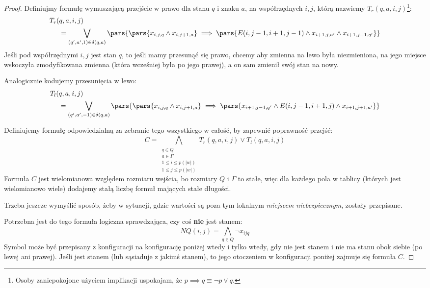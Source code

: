 \begin{proof}
        Definiujmy formułę wymuszającą przejście w prawo dla stanu \(q\) i znaku \(a\), na współrzędnych \(i, j\), którą nazwiemy \(T_r(q, a, i, j)\)\footnote{Osoby zaniepokojone użyciem implikacji uspokajam, że \(p \implies q \equiv \neg p \lor q\).}:
        \[
            \begin{split}
            T_r(&q,a, i, j)\\
                &= \bigvee_{(q', a', 1) \in \delta(q,a)} \pars{\pars{x_{i,j,q} \land x_{i, j + 1, a}} \implies \pars{E(i, j-1, i+1, j-1) \land x_{i+1, j, a'} \land x_{i+1, j+1, q'}}}
            \end{split}
        \]
        Jeśli pod współrzędnymi \(i,j\) jest stan \(q\), to jeśli mamy przesunąć się prawo, chcemy aby zmienna na lewo była niezmieniona, na jego miejsce wskoczyła zmodyfikowana zmienna (która wcześniej była po jego prawej), a on sam zmienił swój stan na nowy. 
        
        Analogicznie kodujemy przesunięcia w lewo:
        \[
            \begin{split}
                T_l(&q, a , i, j)\\
                    &= \bigvee_{(q', a', -1) \in \delta(q,a)} \pars{\pars{x_{i,j,q} \land x_{i, j + 1, a}} \implies \pars{x_{i+1, j-1, q'} \land E(i, j-1, i+1, j) \land x_{i + 1,j + 1,a'}}}
            \end{split}
        \]
    
        Definiujemy formułę odpowiedzialną za zebranie tego wszystkiego w całość, by zapewnić poprawność przejść:
        \[ 
            C = \bigwedge_{\substack{q \in Q \\ a \in \Gamma \\ 1 \leq i \leq p(|w|) \\ 1 \leq j \leq p(|w|)}} T_r(q,a,i,j) \lor T_l(q,a,i,j) 
        \]
        Formuła \(C\) jest wielomianowa względem rozmiaru wejścia, bo rozmiary \(Q\) i \(\Gamma\) to stałe, więc dla każdego pola w tablicy (których jest wielomianowo wiele) dodajemy stałą liczbę formuł mających stałe długości. 
        
        Trzeba jeszcze wymyślić sposób, żeby w sytuacji, gdzie wartości są poza tym lokalnym \textit{miejscem niebezpiecznym}, zostały przepisane. 
        
        Potrzebna jest do tego formuła logiczna sprawdzająca, czy coś \textbf{nie} jest stanem:
        \[
            NQ(i,j) = \bigwedge_{q \in Q} \neg x_{ijq}
        \]
        Symbol może być przepisany z konfiguracji na konfigurację poniżej wtedy i tylko wtedy, gdy nie jest stanem i nie ma stanu obok siebie (po lewej ani prawej).
        Jeśli jest stanem (lub sąsiaduje z jakimś stanem), to jego otoczeniem w konfiguracji poniżej zajmuje się formuła \(C\).
        

\end{proof}
